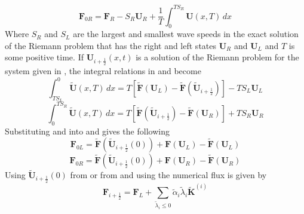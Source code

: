 \begin{equation}\label{eqn:flux2}
	\boldsymbol{F}_{0R} = \boldsymbol{F}_R - S_R \boldsymbol{U}_R + \frac{1}{T} \int_{0}^{TS_R} \boldsymbol{U}\left(x,T\right)\,dx
\end{equation}
Where $S_R$ and $S_L$ are the largest and smallest wave speeds in the exact solution of the Riemann problem that has the right and left states $\boldsymbol{U}_R$ and $\boldsymbol{U}_L$ and $T$ is some positive time. If $\boldsymbol{U}_{i+\frac{1}{2}} \left(x,t\right)$ is a solution of the Riemann problem for the system given in , the integral relations in  and  become
\begin{equation}\label{eqn:flux12}
	\int_{TS_L}^{0} \tilde{\boldsymbol{U}}\left(x,T\right)\,dx = T\left[\tilde{\boldsymbol{F}}\left(\boldsymbol{U}_L\right) - \tilde{\boldsymbol{F}}\left(\tilde{\boldsymbol{U}}_{i+\frac{1}{2}}\right)\right] - T S_L \boldsymbol{U}_L
\end{equation}
\begin{equation}\label{eqn:flux22}
	\int_{0}^{TS_R} \tilde{\boldsymbol{U}}\left(x,T\right)\,dx = T\left[\tilde{\boldsymbol{F}}\left(\tilde{\boldsymbol{U}}_{i+\frac{1}{2}}\right) - \tilde{\boldsymbol{F}}\left(\boldsymbol{U}_R\right)\right] + T S_R \boldsymbol{U}_R
\end{equation}
Substituting  and  into  and  gives the following
\begin{equation}\label{eqn:flux13}
	\boldsymbol{F}_{0L} = \tilde{\boldsymbol{F}}\left(\tilde{\boldsymbol{U}}_{i+\frac{1}{2}}\left(0\right)\right) + \boldsymbol{F}\left(\boldsymbol{U}_L\right) - \tilde{\boldsymbol{F}}\left(\boldsymbol{U}_L\right)
\end{equation}
\begin{equation}\label{eqn:flux23}
	\boldsymbol{F}_{0R} = \tilde{\boldsymbol{F}}\left(\tilde{\boldsymbol{U}}_{i+\frac{1}{2}}\left(0\right)\right) + \boldsymbol{F}\left(\boldsymbol{U}_R\right) - \tilde{\boldsymbol{F}}\left(\boldsymbol{U}_R\right)
\end{equation}
Using $\tilde{\boldsymbol{U}}_{i+\frac{1}{2}}\left(0\right)$ from  or from  and using  the numerical flux is given by
\begin{equation}\label{eqn:Fsum1}
	\boldsymbol{F}_{i+\frac{1}{2}} = \boldsymbol{F}_L + \sum_{\tilde{\lambda}_i \le 0} \tilde{\alpha}_i  \tilde{\lambda}_i  \tilde{\boldsymbol{K}}^{\left(i\right)}
\end{equation}
